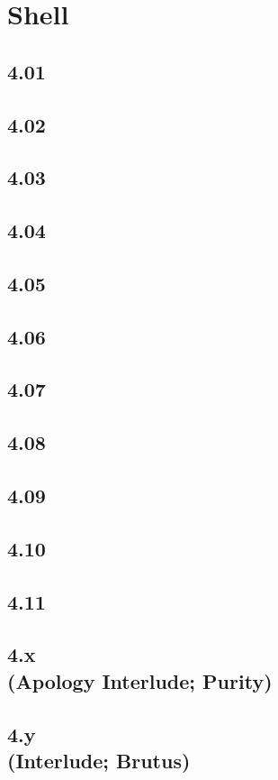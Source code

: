 \part{Shell}


\chapter{4.01}


\chapter{4.02}


\chapter{4.03}


\chapter{4.04}


\chapter{4.05}


\chapter{4.06}


\chapter{4.07}


\chapter{4.08}


\chapter{4.09}


\chapter{4.10}


\chapter{4.11}


\chapter[4.x (Apology Interlude; Purity)]{4.x\\(Apology Interlude; Purity)}


\chapter[4.y (Interlude; Brutus)]{4.y\\(Interlude; Brutus)}

